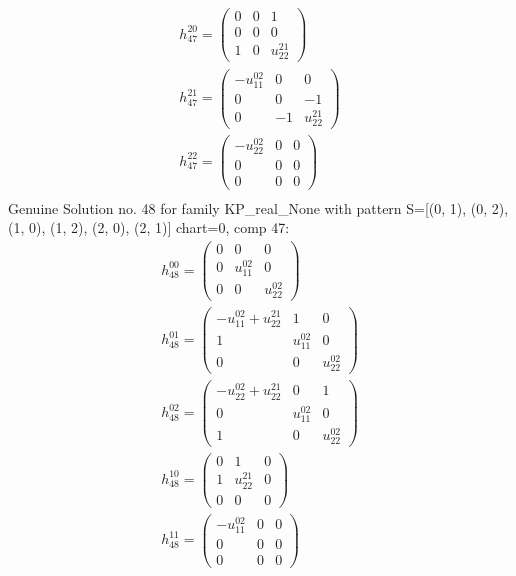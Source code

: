 \documentclass[a4paper, 11pt, twoside, onecolumn]{article}
\begin{document}
\begin{landscape}
\begin{gather*}
	 h_{47}^{20}=\begin{pmatrix}0 & 0 & 1\\0 & 0 & 0\\1 & 0 & u^{21}_{22}\end{pmatrix}\\ 
	 h_{47}^{21}=\begin{pmatrix}- u^{02}_{11} & 0 & 0\\0 & 0 & -1\\0 & -1 & u^{21}_{22}\end{pmatrix}\\ 
	 h_{47}^{22}=\begin{pmatrix}- u^{02}_{22} & 0 & 0\\0 & 0 & 0\\0 & 0 & 0\end{pmatrix}\\ 
\end{gather*} 
Genuine Solution no. 48 for family KP_real_None with pattern S=[(0, 1), (0, 2), (1, 0), (1, 2), (2, 0), (2, 1)] chart=0, comp 47: 
\begin{gather*} 
	 h_{48}^{00}=\begin{pmatrix}0 & 0 & 0\\0 & u^{02}_{11} & 0\\0 & 0 & u^{02}_{22}\end{pmatrix}\\ 
	 h_{48}^{01}=\begin{pmatrix}- u^{02}_{11} + u^{21}_{22} & 1 & 0\\1 & u^{02}_{11} & 0\\0 & 0 & u^{02}_{22}\end{pmatrix}\\ 
	 h_{48}^{02}=\begin{pmatrix}- u^{02}_{22} + u^{21}_{22} & 0 & 1\\0 & u^{02}_{11} & 0\\1 & 0 & u^{02}_{22}\end{pmatrix}\\ 
	 h_{48}^{10}=\begin{pmatrix}0 & 1 & 0\\1 & u^{21}_{22} & 0\\0 & 0 & 0\end{pmatrix}\\ 
	 h_{48}^{11}=\begin{pmatrix}- u^{02}_{11} & 0 & 0\\0 & 0 & 0\\0 & 0 & 0\end{pmatrix}\\ 

\end{gather*}
\end{landscape}
\end{document}
